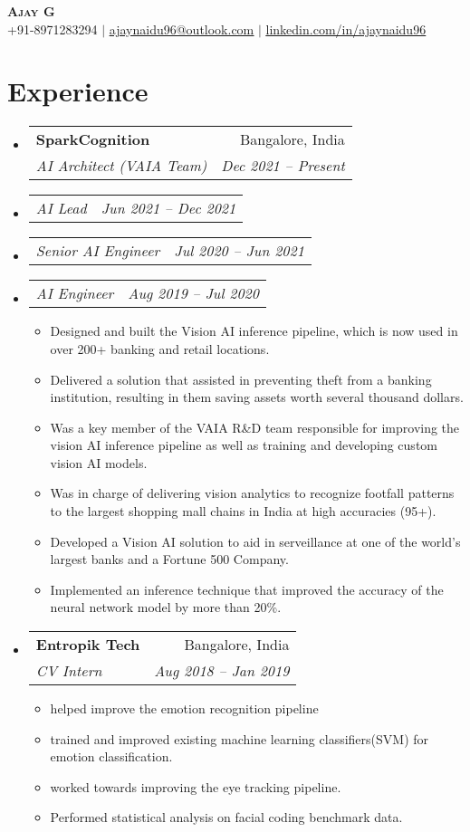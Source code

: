 \documentclass[letterpaper,11pt]{article}
\makeatletter
\newcommand{\resumeItem}[1]{
  \item\small{
    {#1 \vspace{-2pt}}
  }
}
\newcommand{\resumeSubheading}[4]{
  \vspace{-2pt}\item
    \begin{tabular*}{0.97\textwidth}[t]{l@{\extracolsep{\fill}}r}
      \textbf{#1} & #2 \\
      \textit{\small#3} & \textit{\small #4} \\
    \end{tabular*}\vspace{-7pt}
}
\newcommand{\resumeSubSubheading}[2]{
    \item
    \begin{tabular*}{0.97\textwidth}{l@{\extracolsep{\fill}}r}
      \textit{\small#1} & \textit{\small #2} \\
    \end{tabular*}\vspace{-7pt}
}
\newcommand{\resumeSubHeadingListStart}{\begin{itemize}[leftmargin=0.15in, label={}]}
\newcommand{\resumeSubHeadingListEnd}{\end{itemize}}
\newcommand{\resumeItemListStart}{\begin{itemize}}
\newcommand{\resumeItemListEnd}{\end{itemize}\vspace{-5pt}}
\makeatother
\begin{document}
\begin{center}
    \textbf{\Huge \scshape Ajay G} \\ \vspace{1pt}
    \small +91-8971283294 $|$ \href{mailto:ajaynaidu96@outlook.com}{\underline{ajaynaidu96@outlook.com}} $|$ 
    \href{https://www.linkedin.com/in/ajaynaidu96/}{\underline{linkedin.com/in/ajaynaidu96}}
\end{center}


\section{Experience}
  \resumeSubHeadingListStart

    \resumeSubheading
      {SparkCognition}{Bangalore, India}
      {AI Architect (VAIA Team)}{Dec 2021 -- Present}
      \resumeSubSubheading
        {AI Lead}{Jun 2021 -- Dec 2021}
      \resumeSubSubheading
        {Senior AI Engineer}{Jul 2020 -- Jun 2021}
      \resumeSubSubheading
        {AI Engineer}{Aug 2019 -- Jul 2020}
          \resumeItemListStart
            \resumeItem{Designed and built the Vision AI inference pipeline, which is now used in over 200+ banking and retail locations.}
            \resumeItem{Delivered a solution that assisted in preventing theft from a banking institution, resulting in them saving assets worth several thousand dollars.}
            \resumeItem{Was a key member of the VAIA R\&D team responsible for improving the vision AI inference pipeline as well as training and developing custom vision AI models.}
            \resumeItem{Was in charge of delivering vision analytics to recognize footfall patterns to the largest shopping mall chains in India at high accuracies (95+).}
            \resumeItem{Developed a Vision AI solution to aid in serveillance at one of the world's largest banks and a Fortune 500 Company.}
            \resumeItem{Implemented an inference technique that improved the accuracy of the neural network model by more than 20\%.}
          \resumeItemListEnd

      \resumeSubheading
      {Entropik Tech}{Bangalore, India} 
      {CV Intern}{Aug 2018 -- Jan 2019}
      \resumeItemListStart
        \resumeItem{helped improve the emotion recognition pipeline}
        \resumeItem{trained and improved existing machine learning classifiers(SVM) for emotion classification.}
        \resumeItem{worked towards improving the eye tracking pipeline.}
        \resumeItem{Performed statistical analysis on facial coding benchmark data.}
      \resumeItemListEnd
  \resumeSubHeadingListEnd
\end{document}
